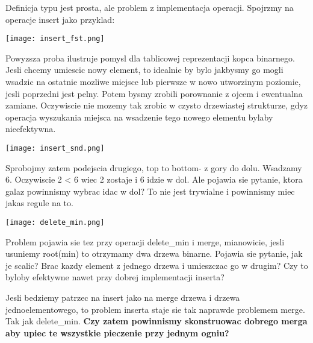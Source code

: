 \documentclass{article}
\begin{document}
Definicja typu jest prosta, ale problem z implementacja operacji. Spojrzmy na operacje insert jako przyklad:


\begin{center}
    \begin{minipage}[h]{0.8\textwidth}
        \centering
        \texttt{[image: insert\_fst.png]}
    \end{minipage}    
\end{center}

Powyzsza proba ilustruje pomysl dla tablicowej reprezentacji kopca binarnego. Jesli chcemy umiescic nowy element, to idealnie by bylo jakbysmy go mogli wsadzic na ostatnie mozliwe miejsce lub pierwsze w nowo utworzinym poziomie, jesli poprzedni jest pelny. Potem bysmy zrobili porownanie z ojcem i ewentualna zamiane. Oczywiscie nie mozemy tak zrobic w czysto drzewiastej strukturze, gdyz operacja wyszukania miejsca na wsadzenie tego nowego elementu bylaby nieefektywna. 


\begin{center}
    \begin{minipage}[h]{0.8\textwidth}
        \centering
        \texttt{[image: insert\_snd.png]}
    \end{minipage}    
\end{center}

Sprobojmy zatem podejscia drugiego, top to bottom- z gory do dolu. Wsadzamy 6. Oczywiscie 2 < 6 wiec 2 zostaje i 6 idzie w dol. Ale pojawia sie pytanie, ktora galaz powinnismy wybrac idac w dol? To nie jest trywialne i powinnismy miec jakas regule na to.

\begin{center}
    \begin{minipage}[h]{0.8\textwidth}
        \centering
        \texttt{[image: delete\_min.png]}
    \end{minipage}    
\end{center}

Problem pojawia sie tez przy operacji delete\_min i merge, mianowicie, jesli usuniemy root(min) to otrzymamy dwa drzewa binarne. Pojawia sie pytanie, jak je scalic? Brac kazdy element z jednego drzewa i umieszczac go w drugim? Czy to byloby efektywne nawet przy dobrej implementacji inserta?

Jesli bedziemy patrzec na insert jako na merge drzewa i drzewa jednoelementowego, to problem inserta staje sie tak naprawde problemem merge. Tak jak delete\_min. \textbf{Czy zatem powinnismy skonstruowac dobrego merga aby upiec te wszystkie pieczenie przy jednym ogniu?}
\end{document}
